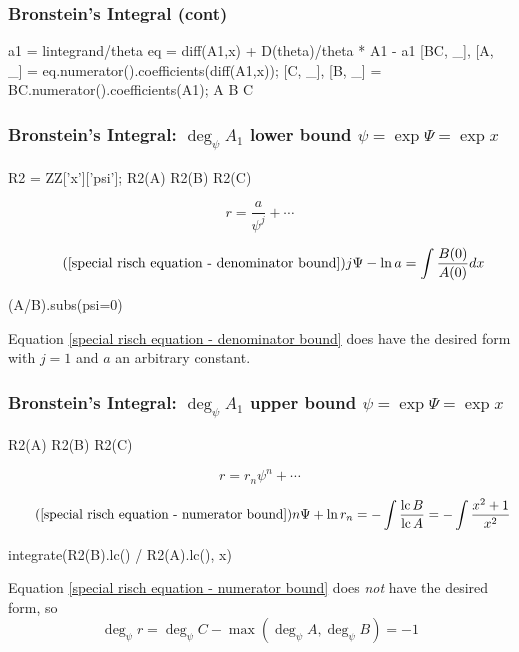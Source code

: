 \documentclass[aspectratio=169,dvipsnames]{beamer}
\newcommand{\lc}{{\rm lc\,}}
\begin{document}
\begin{frame}[fragile]
\frametitle{Bronstein's Integral (cont)}

\begin{sageblock}[bronstein]
a1 = lintegrand/theta
eq = diff(A1,x) + D(theta)/theta * A1 - a1
[BC, _], [A, _] = eq.numerator().coefficients(diff(A1,x));
[C, _], [B, _] = BC.numerator().coefficients(A1);
A
B
C
\end{sageblock}

\end{frame}

\begin{frame}[fragile]
\frametitle{Bronstein's Integral: $\deg_\psi A_1$ lower bound \hfill $\psi = \exp \Psi = \exp x$}
\tiny

\begin{sageblock}[bronstein]
R2 = ZZ['x']['psi'];
R2(A)
R2(B)
R2(C)
\end{sageblock}

\bigskip
$$r = \frac{a}{\psi^j} + \cdots$$

\begin{equation}
\tag{\ref{special risch equation - denominator bound}}
j \Psi - \ln a = \int \frac{B(0)}{A(0)} dx
\end{equation}

\begin{sageblock}[bronstein]
(A/B).subs(psi=0)
\end{sageblock}

\bigskip
Equation \ref{special risch equation - denominator bound}
does have the desired form with $j=1$ and $a$ an arbitrary constant.

\end{frame}

\begin{frame}[fragile]
\frametitle{Bronstein's Integral: $\deg_\psi A_1$ upper bound \hfill $\psi = \exp \Psi = \exp x$}
\tiny

\begin{sageblock}[bronstein]
R2(A)
R2(B)
R2(C)
\end{sageblock}

$$r = r_n \psi^n + \cdots$$

\begin{equation}
\tag{\ref{special risch equation - numerator bound}}
n \Psi + \ln r_n = - \int \frac{\lc B}{\lc A} = - \int \frac{x^2+1}{x^2}
\end{equation}

\begin{sageblock}[bronstein]
integrate(R2(B).lc() / R2(A).lc(), x)
\end{sageblock}

\bigskip
Equation \ref{special risch equation - numerator bound}
does {\it not} have the desired form, so
$$\deg_\psi r = \deg_\psi C - \max(\deg_\psi A, \deg_\psi B) = -1$$

\end{frame}
\end{document}
